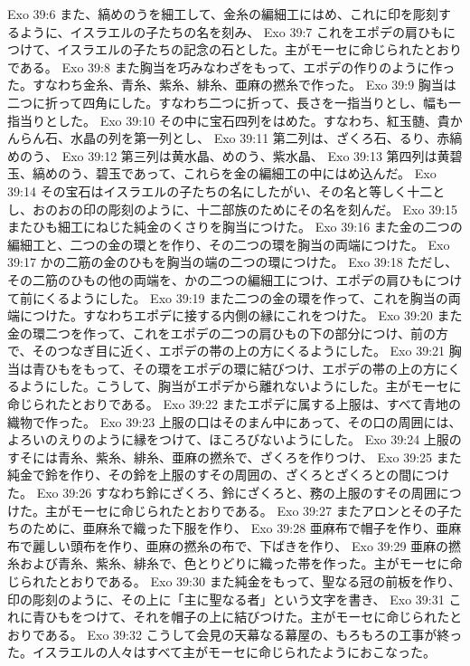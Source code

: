 Exo 39:6  また、縞めのうを細工して、金糸の編細工にはめ、これに印を彫刻するように、イスラエルの子たちの名を刻み、
Exo 39:7  これをエポデの肩ひもにつけて、イスラエルの子たちの記念の石とした。主がモーセに命じられたとおりである。
Exo 39:8  また胸当を巧みなわざをもって、エポデの作りのように作った。すなわち金糸、青糸、紫糸、緋糸、亜麻の撚糸で作った。
Exo 39:9  胸当は二つに折って四角にした。すなわち二つに折って、長さを一指当りとし、幅も一指当りとした。
Exo 39:10  その中に宝石四列をはめた。すなわち、紅玉髄、貴かんらん石、水晶の列を第一列とし、
Exo 39:11  第二列は、ざくろ石、るり、赤縞めのう、
Exo 39:12  第三列は黄水晶、めのう、紫水晶、
Exo 39:13  第四列は黄碧玉、縞めのう、碧玉であって、これらを金の編細工の中にはめ込んだ。
Exo 39:14  その宝石はイスラエルの子たちの名にしたがい、その名と等しく十二とし、おのおの印の彫刻のように、十二部族のためにその名を刻んだ。
Exo 39:15  またひも細工にねじた純金のくさりを胸当につけた。
Exo 39:16  また金の二つの編細工と、二つの金の環とを作り、その二つの環を胸当の両端につけた。
Exo 39:17  かの二筋の金のひもを胸当の端の二つの環につけた。
Exo 39:18  ただし、その二筋のひもの他の両端を、かの二つの編細工につけ、エポデの肩ひもにつけて前にくるようにした。
Exo 39:19  また二つの金の環を作って、これを胸当の両端につけた。すなわちエポデに接する内側の縁にこれをつけた。
Exo 39:20  また金の環二つを作って、これをエポデの二つの肩ひもの下の部分につけ、前の方で、そのつなぎ目に近く、エポデの帯の上の方にくるようにした。
Exo 39:21  胸当は青ひもをもって、その環をエポデの環に結びつけ、エポデの帯の上の方にくるようにした。こうして、胸当がエポデから離れないようにした。主がモーセに命じられたとおりである。
Exo 39:22  またエポデに属する上服は、すべて青地の織物で作った。
Exo 39:23  上服の口はそのまん中にあって、その口の周囲には、よろいのえりのように縁をつけて、ほころびないようにした。
Exo 39:24  上服のすそには青糸、紫糸、緋糸、亜麻の撚糸で、ざくろを作りつけ、
Exo 39:25  また純金で鈴を作り、その鈴を上服のすその周囲の、ざくろとざくろとの間につけた。
Exo 39:26  すなわち鈴にざくろ、鈴にざくろと、務の上服のすその周囲につけた。主がモーセに命じられたとおりである。
Exo 39:27  またアロンとその子たちのために、亜麻糸で織った下服を作り、
Exo 39:28  亜麻布で帽子を作り、亜麻布で麗しい頭布を作り、亜麻の撚糸の布で、下ばきを作り、
Exo 39:29  亜麻の撚糸および青糸、紫糸、緋糸で、色とりどりに織った帯を作った。主がモーセに命じられたとおりである。
Exo 39:30  また純金をもって、聖なる冠の前板を作り、印の彫刻のように、その上に「主に聖なる者」という文字を書き、
Exo 39:31  これに青ひもをつけて、それを帽子の上に結びつけた。主がモーセに命じられたとおりである。
Exo 39:32  こうして会見の天幕なる幕屋の、もろもろの工事が終った。イスラエルの人々はすべて主がモーセに命じられたようにおこなった。
